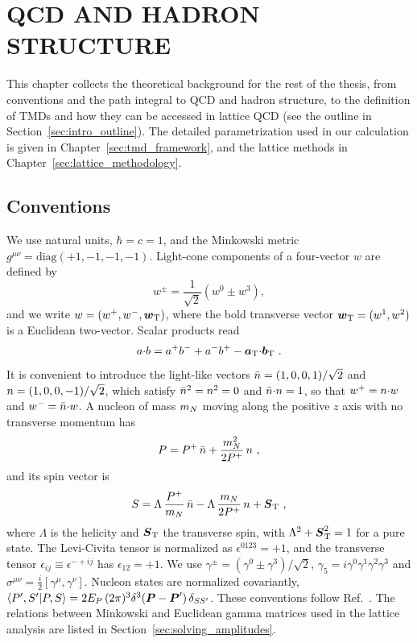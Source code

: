 \section{QCD AND HADRON STRUCTURE}
\label{sec:qcd_hadron}

This chapter collects the theoretical background for the rest of the thesis, from conventions and the path integral to QCD and hadron structure, to the definition of TMDs and how they can be accessed in lattice QCD (see the outline in Section~\ref{sec:intro_outline}). The detailed parametrization used in our calculation is given in Chapter~\ref{sec:tmd_framework}, and the lattice methods in Chapter~\ref{sec:lattice_methodology}.

\subsection{Conventions}
\label{sec:conventions}

We use natural units, $\hbar = c = 1$, and the Minkowski metric $g^{\mu\nu} = \mathrm{diag}(+1,-1,-1,-1)$. Light-cone components of a four-vector $w$ are defined by
\begin{equation}
  w^{\pm} = \frac{1}{\sqrt{2}}\left(w^0 \pm w^3\right) ,
  \label{eq:lightcone_components}
\end{equation}
and we write $w = (w^+, w^-, \vprp{w})$, where the bold transverse vector $\vprp{w} = (w^1,w^2)$ is a Euclidean two-vector. Scalar products read
\begin{equation}
  a\tcdot b = a^+ b^- + a^- b^+ - \vprp{a}\tcdot\vprp{b} \ .
\end{equation}
It is convenient to introduce the light-like vectors $\nplus = (1,0,0,1)/\sqrt{2}$ and $\nminus = (1,0,0,-1)/\sqrt{2}$, which satisfy $\nplus^2 = \nminus^2 = 0$ and $\nplus\tcdot\nminus = 1$, so that $w^+ = \nminus\tcdot w$ and $w^- = \nplus\tcdot w$. A nucleon of mass $\mN$ moving along the positive $z$ axis with no transverse momentum has
\begin{equation}
  P = P^+\,\nplus + \frac{\mN^2}{2P^+}\,\nminus \ ,
\end{equation}
and its spin vector is
\begin{equation}
  S = \Lambda\,\frac{P^+}{\mN}\,\nplus - \Lambda\,\frac{\mN}{2P^+}\,\nminus + \vprp{S} \ ,
\end{equation}
where $\Lambda$ is the helicity and $\vprp{S}$ the transverse spin, with $\Lambda^2 + \vprp{S}^2 = 1$ for a pure state. The Levi-Civita tensor is normalized as $\epsilon^{0123} = +1$, and the transverse tensor $\epsilon_{ij}\equiv\epsilon^{-+ij}$ has $\epsilon_{12} = +1$. We use $\gamma^{\pm} = (\gamma^0\pm\gamma^3)/\sqrt{2}$, $\gamma_5 = i\gamma^0\gamma^1\gamma^2\gamma^3$ and $\sigma^{\mu\nu} = \frac{i}{2}[\gamma^\mu,\gamma^\nu]$. Nucleon states are normalized covariantly, $\langle P',S'|P,S\rangle = 2E_P\,(2\pi)^3\delta^{3}(\vect{P}-\vect{P}')\,\delta_{SS'}$. These conventions follow Ref.~\cite{Musch:2011er}. The relations between Minkowski and Euclidean gamma matrices used in the lattice analysis are listed in Section~\ref{sec:solving_amplitudes}.

